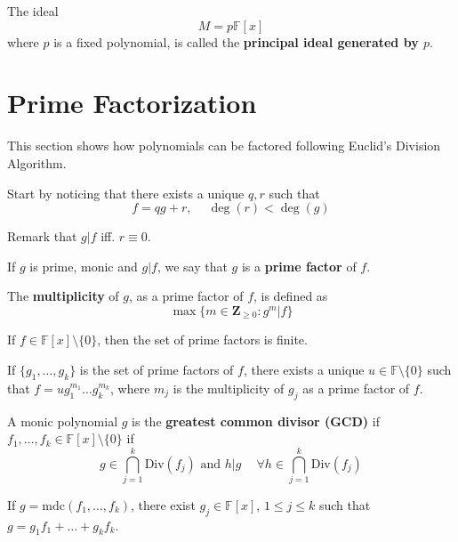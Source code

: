 The ideal \[ M = p \mathbb{F}[x] \] where $p$ is a fixed polynomial, is called the \textbf{principal ideal generated by $p$}.

\section{Prime Factorization}

This section shows how polynomials can be factored following Euclid's Division Algorithm.

Start by noticing that there exists a unique $q, r$ such that 
\[
	f = qg + r, ~\quad \deg(r) < \deg(g)
\]

Remark that $g | f$  iff. $r \equiv 0$.

\begin{definition}
	If $g$ is prime, monic and $g | f$, we say that $g$ is a \textbf{prime factor} of $f$.
	
	The \textbf{multiplicity} of $g$, as a prime factor of $f$, is defined as
	\[
		\max \{ m \in \textbf{Z}_{\geq 0} : g^m | f \}
	\]
\end{definition}

\begin{theorem}
	If $f \in \mathbb{F}[x] \setminus \{ 0 \}$, then the set of prime factors is finite.
	
If $\{ g_1, \ldots, g_k \}$ is the set of prime factors of $f$, there exists a unique $u \in \mathbb{F} \setminus \{ 0 \}$ such that $f = u g_1^{m_1} \ldots g_k^{m_k}$, where $m_j$ is the multiplicity of $g_j$ as a prime factor of $f$.
\end{theorem}

A monic polynomial $g$ is the \textbf{greatest common divisor (GCD)} if $f_1, \ldots, f_k \in \mathbb{F}[x] \setminus \{ 0 \}$ if
\[
	g \in \bigcap_{j=1}^k \text{Div}(f_j) \text{ and } h | g ~\quad \forall h \in \bigcap_{j=1}^k \text{Div}(f_j)
\]

\begin{theorem}
	If $g = \text{mdc}(f_1, \ldots, f_k)$, there exist $g_j \in \mathbb{F}[x]$, $1 \leq j \leq k$ such that $g = g_1 f_1 + \ldots + g_k f_k$.
\end{theorem}